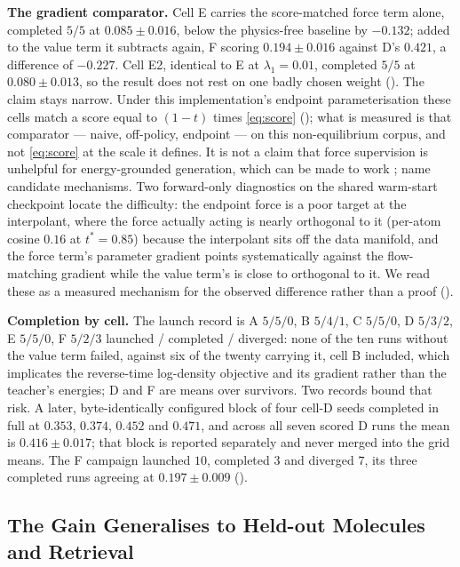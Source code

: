 \textbf{The gradient comparator.} Cell E carries the score-matched force term alone, completed $5/5$
at $0.085 \pm 0.016$, below the physics-free baseline by $-0.132$; added to the value term it
subtracts again, F scoring $0.194 \pm 0.016$ against D's $0.421$, a difference of $-0.227$. Cell E2,
identical to E at $\lambda_1 = 0.01$, completed $5/5$ at $0.080 \pm 0.013$, so the result does not
rest on one badly chosen weight (). The claim stays narrow. Under this implementation's endpoint
parameterisation these cells match a score equal to $(1-t)$ times \eqref{eq:score}
(); what is measured is that comparator --- naive, off-policy, endpoint --- on
this non-equilibrium corpus, and not \eqref{eq:score} at the scale it defines. It is not a claim that force supervision is unhelpful for
energy-grounded generation, which can be made to work \citep{psm,driftingboltzmann}; 
name candidate mechanisms. Two forward-only diagnostics on the shared warm-start checkpoint locate
the difficulty: the endpoint force is a poor target at the interpolant, where the force actually
acting is nearly orthogonal to it (per-atom cosine $0.16$ at $t^{*} = 0.85$) because the
interpolant sits off the data manifold, and the force term's parameter gradient points
systematically against the flow-matching gradient while the value term's is close to orthogonal to
it. We read these as a measured mechanism for the observed difference rather than a proof
().

\textbf{Completion by cell.} The launch record is A $5/5/0$, B $5/4/1$, C $5/5/0$, D $5/3/2$, E
$5/5/0$, F $5/2/3$ launched / completed / diverged: none of the ten runs without the value term
failed, against six of the twenty carrying it, cell B included, which implicates the reverse-time
log-density objective and its gradient rather than the teacher's energies; D and F are means over
survivors. Two records bound that risk. A later, byte-identically configured block of four cell-D
seeds completed in full at $0.353$, $0.374$, $0.452$ and $0.471$, and across all seven scored D runs
the mean is $0.416 \pm 0.017$; that block is reported separately and never merged into the grid
means. The F campaign launched $10$, completed $3$ and diverged $7$, its three completed runs
agreeing at $0.197 \pm 0.009$ ().

\subsection{The Gain Generalises to Held-out Molecules and Retrieval}
\label{sec:mainresult}
\label{sec:main}
\label{sec:reference}

